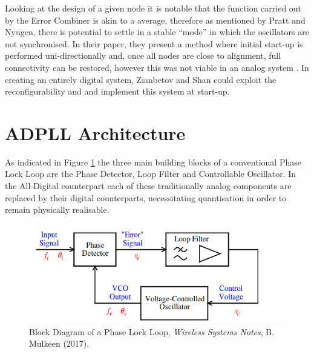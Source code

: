 \documentclass[11pt,english,british]{report}
\begin{document}
Looking at the design of a given node it is notable that the function carried out by the Error Combiner is akin to a average, therefore as mentioned by Pratt and Nyugen, there is potential to settle in a stable ``mode'' in which the oscillators are not synchronised. In their paper, they present a method where initial start-up is performed uni-directionally and, once all nodes are close to alignment, full connectivity can be restored, however this was not viable in an analog system \cite{pratt1995distributed}. In creating an entirely digital system, Zianbetov and Shan could exploit the reconfigurability and and implement this system at start-up.

\section{ADPLL Architecture}
As indicated in Figure \ref{fig:mulkeen_pll} the three main building blocks of a conventional Phase Lock Loop are the Phase Detector, Loop Filter and Controllable Oscillator. In the All-Digital counterpart each of these traditionally analog components are replaced by their digital counterparts, necessitating quantisation in order to remain physically realisable. 
\begin{figure}[h]
	\centering
	\includegraphics[scale=0.5]{mulkeen_pll}
	\caption{Block Diagram of a Phase Lock Loop, \textit{Wireless Systems Notes}, B. Mulkeen (2017).}
	\label{fig:mulkeen_pll}
\end{figure}
\end{document}
